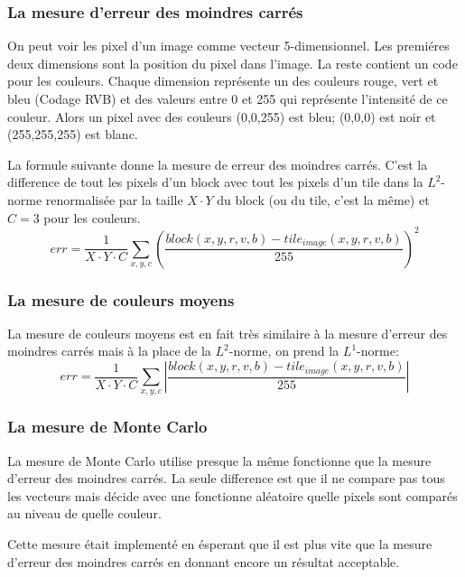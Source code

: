 \documentclass[a4paper]{article}
\begin{document}
\subsubsection{La mesure d'erreur des moindres carr\'es}

On peut voir les pixel d'un image comme vecteur 5-dimensionnel.
Les premi\'eres deux dimensions sont la position du pixel dans l'image.
La reste contient un code pour les couleurs. Chaque dimension repr\'esente un des couleurs rouge, vert et bleu (Codage RVB) et des valeurs entre 0 et 255 qui repr\'esente l'intensit\'e de ce couleur.
Alors un pixel avec des couleurs (0,0,255) est bleu;
(0,0,0) est noir et (255,255,255) est blanc.

La formule suivante donne la mesure de erreur des moindres carr\'es.
C'est la difference de tout les pixels d'un block avec tout les pixels d'un tile dans la $L^2$-norme renormalis\'ee par la taille $X\cdot Y$ du block (ou du tile, c'est la m\^eme) et $C=3$ pour les couleurs. 
\begin{equation}
err=\frac{1}{X\cdot Y\cdot C}\sum_{x,y,c}\left(\frac{block(x,y,r,v,b)-tile_{image}(x,y,r,v,b)}{255}\right)^2
\end{equation}
 
\subsubsection{La mesure de couleurs moyens}
La mesure de couleurs moyens est en fait tr\`es similaire \`a la mesure d'erreur des moindres carr\'es mais \`a la place de la $L^2$-norme, on prend la $L^1$-norme:
\begin{equation}
err=\frac{1}{X\cdot Y\cdot C}\sum_{x,y,c}\left|\frac{block(x,y,r,v,b)-tile_{image}(x,y,r,v,b)}{255}\right|
\end{equation}

\subsubsection{La mesure de Monte Carlo}
La mesure de Monte Carlo utilise presque la m\^eme fonctionne que la mesure d'erreur des moindres carr\'es.
La seule difference est que il ne compare pas tous les vecteurs mais d\'ecide avec une fonctionne al\'eatoire quelle pixels sont compar\'es au niveau de quelle couleur.

Cette mesure \'etait implement\'e en \'esperant que il est plus vite que la mesure d'erreur des moindres carr\'es en donnant encore un r\'esultat acceptable.
\end{document}
